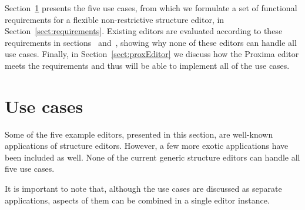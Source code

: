 Section~\ref{sect:usecases} presents the five use cases, from which we formulate a set of functional requirements for a flexible non-restrictive structure editor, in Section~\ref{sect:requirements}. Existing editors are evaluated according to these requirements in sections~\label{sect:overview} and~\label{sect:discussion}, showing why none of these editors can handle all use cases. Finally, in Section~\ref{sect:proxEditor} we discuss how the Proxima editor meets the requirements and thus will be able to implement all of the use cases.

\section{Use cases}
\label{sect:usecases}

Some of the five example editors, presented in this section, are well-known applications of structure editors. However, a few more exotic applications have been included as well. None of the current generic structure editors can handle all five use cases.

It is important to note that, although the use cases are discussed as separate applications, aspects of them can be combined in a single editor instance.

\newcommand{\screenshot}[2]{%
%
\noindent 
\begin{center}
\begin{picture}(250,180)(0,0)
\begin{tiny}
\put(0,30){ \framebox(250,150){#1}}
\end{tiny}
\put(0,0) { \makebox(250,30){#2}}
\end{picture}
\end{center}
}

\newcommand{\smallScreenshot}[2]{%
%
\noindent
\begin{center}
\begin{picture}(170,130)(0,0)
\begin{tiny}
\put(0,30){ \framebox(170,100){#1}}
\end{tiny}
\put(0,0) { \makebox(170,30){#2}}
\end{picture}
\end{center}
}

\newcommand{\editScreenshot}[4]{%
%
\noindent
\begin{center}
\begin{picture}(350,130)(0,0)
\begin{tiny}
\put(0,30){ \framebox(170,100){#1}}
\put(180,30){ \framebox(170,100){#2}}
\end{tiny}
\put(170,13){ $\Rightarrow$}
\put(0,0) { \makebox(170,30){#3}}
\put(180,0) { \makebox(170,30){#4}}
\end{picture}
\end{center}
}


